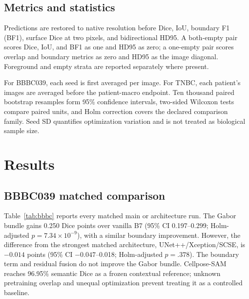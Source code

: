 \documentclass{article}
\begin{document}
\subsection{Metrics and statistics}
Predictions are restored to native resolution before Dice, IoU, boundary F1 (BF1), surface Dice at two pixels, and bidirectional HD95. A both-empty pair scores Dice, IoU, and BF1 as one and HD95 as zero; a one-empty pair scores overlap and boundary metrics as zero and HD95 as the image diagonal. Foreground and empty strata are reported separately where present.

For BBBC039, each seed is first averaged per image. For TNBC, each patient's images are averaged before the patient-macro endpoint. Ten thousand paired bootstrap resamples form 95\% confidence intervals, two-sided Wilcoxon tests compare paired units, and Holm correction covers the declared comparison family. Seed SD quantifies optimization variation and is not treated as biological sample size.

\section{Results}
\subsection{BBBC039 matched comparison}
Table~\ref{tab:bbbc} reports every matched main or architecture run. The Gabor bundle gains 0.250 Dice points over vanilla B7 (95\% CI 0.197--0.299; Holm-adjusted $p=7.34\times10^{-9}$), with a similar boundary improvement. However, the difference from the strongest matched architecture, UNet++/Xception/SCSE, is $-0.014$ points (95\% CI $-0.047$--0.018; Holm-adjusted $p=.378$). The boundary term and residual fusion do not improve the Gabor bundle. Cellpose-SAM reaches 96.95\% semantic Dice as a frozen contextual reference; unknown pretraining overlap and unequal optimization prevent treating it as a controlled baseline.
\end{document}
